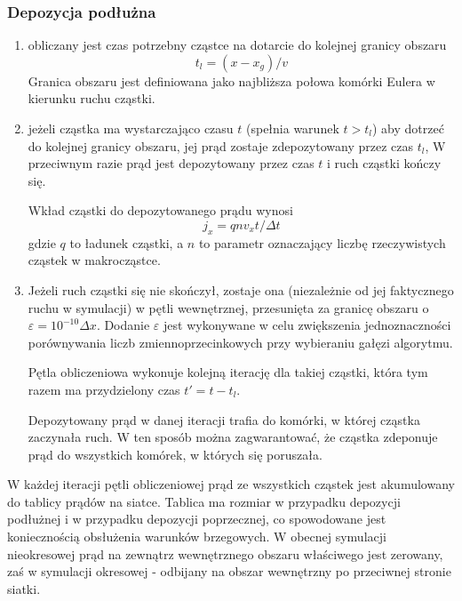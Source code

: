 \subsubsection{Depozycja podłużna} 
\begin{enumerate}
    \item{} obliczany jest czas potrzebny cząstce na dotarcie do kolejnej
    granicy obszaru
    \begin{equation}
        t_l = (x - x_g)/v
    \end{equation}
    Granica obszaru jest definiowana jako najbliższa połowa komórki Eulera w kierunku
    ruchu cząstki.
    \item
    \begin{itemize}
        \itemi{} jeżeli cząstka ma wystarczająco czasu $t$ (spełnia warunek $t > t_l$) aby
        dotrzeć do kolejnej granicy obszaru, jej prąd zostaje zdepozytowany przez czas $t_l$,
        \itemi{} W przeciwnym razie prąd jest depozytowany przez czas $t$ i ruch cząstki kończy się.
    \end{itemize}
    Wkład cząstki do depozytowanego prądu wynosi
    \begin{equation}
        j_x = q n v_x t/\Delta t
    \end{equation}
    gdzie $q$ to ładunek cząstki, a $n$ to parametr  oznaczający liczbę
    rzeczywistych cząstek w makrocząstce.

    \item{} Jeżeli ruch cząstki się nie skończył, zostaje ona (niezależnie od
    jej faktycznego ruchu w symulacji) w pętli wewnętrznej, 
    przesunięta za granicę obszaru o $\varepsilon =
    10^{-10} \Delta x$. Dodanie $\varepsilon$ jest wykonywane w celu zwiększenia
    jednoznaczności porównywania liczb zmiennoprzecinkowych przy wybieraniu
    gałęzi algorytmu.

    Pętla obliczeniowa wykonuje kolejną iterację dla takiej cząstki, która tym razem
    ma przydzielony czas $t' = t - t_l$.

    Depozytowany prąd w danej iteracji trafia do komórki, w której cząstka zaczynała ruch. W ten sposób
    można zagwarantować, że cząstka zdeponuje prąd do wszystkich komórek, w których się poruszała.
\end{enumerate}

W każdej iteracji pętli obliczeniowej prąd ze wszystkich cząstek jest
akumulowany do tablicy prądów na siatce. Tablica ma rozmiar  w
przypadku depozycji podłużnej i  w przypadku depozycji poprzecznej,
co spowodowane jest koniecznością obsłużenia warunków brzegowych.  W obecnej
symulacji nieokresowej prąd na zewnątrz wewnętrznego obszaru właściwego
 jest zerowany, zaś w symulacji okresowej - odbijany na obszar
wewnętrzny po przeciwnej stronie siatki.

